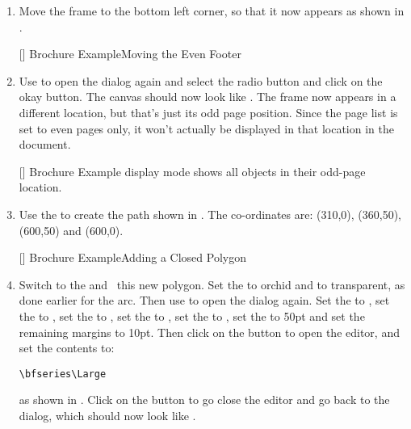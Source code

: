 \begin{enumerate}
[]
{}
{Brochure Example\dash Even Pages Display}

\item Move the  frame to the bottom left corner, so
that it now appears as shown in .

[]
{}
{Brochure Example\dash Moving the Even Footer}

\item Use  to open the
 dialog again and select the
 radio button and click on the okay
button. The \gls{canvas} should now look like
. The  frame now appears in
a different location, but that's just its odd page position. Since
the page list is set to even pages only, it won't actually be
displayed in that location in the document.

[]
{}
{Brochure Example\dash {} display mode shows all objects in
their odd-page location.}

\item Use the 
to create the \gls{path} shown in . The
co-ordinates are: (310,0), (360,50),
(600,50) and (600,0).

[]
{}
{Brochure Example\dash Adding a Closed Polygon}

\item Switch to the  and \select\ this new polygon. Set
the  to orchid and  to
\gls{transparent}, as done earlier for the arc. Then use
 to open the  dialog
again. Set the  to
, set the  to
, set the  to
, set the  to
, set the 
to , set the
 to 50\gls{pt} and set the remaining
margins to 10\gls{pt}. Then click on the 
button to open the editor, and set the contents to:
\begin{verbatim}
\bfseries\Large
\end{verbatim}
as shown in . Click on the  button
to go close the editor and go back to the
 dialog, which should now look like
.


\end{enumerate}
